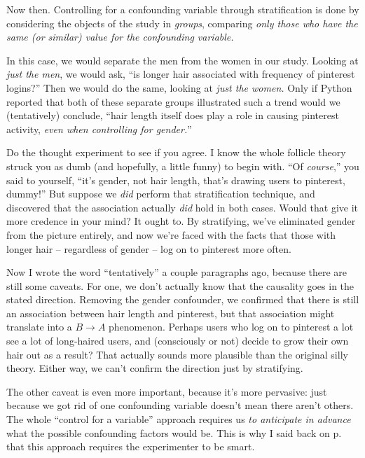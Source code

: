 
Now then. Controlling for a confounding variable through stratification is done
by considering the objects of the study in \textit{groups}, comparing
\textit{only those who have the same (or similar) value for the confounding
variable.}

In this case, we would separate the men from the women in our study. Looking at
\textit{just the men}, we would ask, ``is longer hair associated with frequency
of pinterest logins?'' Then we would do the same, looking at \textit{just the
women.} Only if Python reported that both of these separate groups illustrated
such a trend would we (tentatively) conclude, ``hair length itself does play a
role in causing pinterest activity, \textit{even when controlling for
gender.}''

Do the thought experiment to see if you agree. I know the whole follicle theory
struck you as dumb (and hopefully, a little funny) to begin with. ``Of
\textit{course},'' you said to yourself, ``it's gender, not hair length, that's
drawing users to pinterest, dummy!'' But suppose we \textit{did} perform that
stratification technique, and discovered that the association actually
\textit{did} hold in both cases. Would that give it more credence in your mind?
It ought to. By stratifying, we've eliminated gender from the picture entirely,
and now we're faced with the facts that those with longer hair -- regardless of
gender -- log on to pinterest more often. 


Now I wrote the word ``tentatively'' a couple paragraphs ago, because there are
still some caveats. For one, we don't actually know that the causality goes in
the stated direction. Removing the gender confounder, we confirmed that there
is still an association between hair length and pinterest, but that association
might translate into a $B \rightarrow A$ phenomenon. Perhaps users who log on
to pinterest a lot see a lot of long-haired users, and (consciously or not)
decide to grow their own hair out as a result? That actually sounds more
plausible than the original silly theory. Either way, we can't confirm the
direction just by stratifying.

The other caveat is even more important, because it's more pervasive: just
because we got rid of one confounding variable doesn't mean there aren't
others. The whole ``control for a variable'' approach requires us \textit{to
anticipate in advance} what the possible confounding factors would be. This is
why I said back on p.~\pageref{smart} that this approach requires the
experimenter to be smart.

